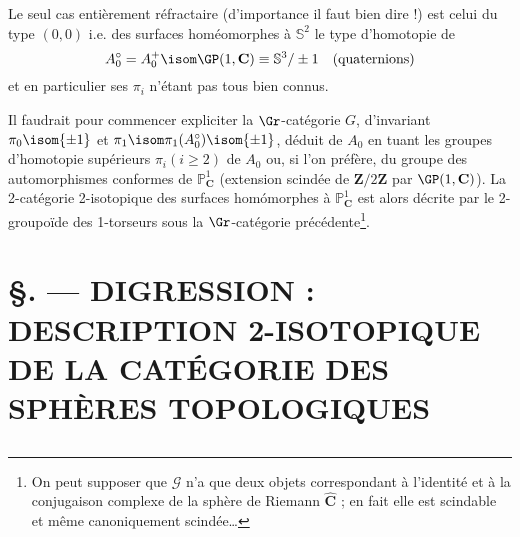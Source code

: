 Le seul cas entièrement réfractaire (d'importance il faut bien dire !) est celui du type $(0, 0)$ i.e. des surfaces homéomorphes à $\mathbb{S}^2$ le type d'homotopie de 
$$
A^\circ_0 = A^+_0 \isom \GP (1, \mathbf{C}) \equiv \mathbb{S}^3 / \pm 1 \quad \text{(quaternions)}
$$
et en particulier ses $\pi_i$ n'étant pas tous bien connus.

Il faudrait pour commencer expliciter la $\Gr$-catégorie $G$, d'invariant $\pi_0 \isom \{ \pm 1 \}$ et $\pi_1 \isom \pi_1 (A^\circ_0) \isom \{ \pm 1 \}$, déduit de $A_0$ en tuant les groupes d'homotopie supérieurs $\pi_i (i \geq 2)$ de $A_0$ ou, si l'on préfère, du groupe des automorphismes conformes de $\mathbb{P}^1_{\mathbf{C}}$ (extension scindée de $\mathbf{Z}/2\mathbf{Z}$ par $\GP (1, \mathbf{C})$). La 2-catégorie 2-isotopique des surfaces homómorphes à $\mathbb{P}^1_{\mathbf{C}}$ est alors décrite par le 2-groupoïde des 1-torseurs sous la $\Gr$-catégorie précédente\footnote{On peut supposer que $\mathcal{G}$ n'a que deux objets correspondant à l'identité et à la conjugaison complexe de la sphère de Riemann $\widehat{\mathbf{C}}$ ; en fait elle est scindable et même canoniquement scindée\dots}.


















\chapter*{\S {}. --- DIGRESSION : DESCRIPTION 2-ISOTOPIQUE DE LA CATÉGORIE DES SPHÈRES TOPOLOGIQUES}\thispagestyle{empty}
\label{sec:20}
\section*{}

